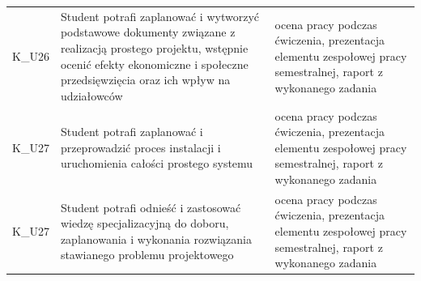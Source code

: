 \documentclass[12pt, a4paper]{article}
\begin{document}
{\begin{longtable}{m{1.6cm}m{9.0cm}m{4.2cm}}
  \rowcolor{tableRowLight} K\_U26 & Student potrafi zaplanować i wytworzyć podstawowe dokumenty związane z realizacją prostego projektu, wstępnie ocenić efekty ekonomiczne i społeczne przedsięwzięcia oraz ich wpływ na udziałowców & ocena pracy podczas ćwiczenia, prezentacja elementu zespołowej pracy semestralnej, raport z wykonanego zadania \\
  \rowcolor{tableRowAlt} K\_U27 & Student potrafi zaplanować i przeprowadzić proces instalacji i uruchomienia całości prostego systemu & ocena pracy podczas ćwiczenia, prezentacja elementu zespołowej pracy semestralnej, raport z wykonanego zadania \\
  \rowcolor{tableRowLight} K\_U27 & Student potrafi odnieść i zastosować wiedzę specjalizacyjną do doboru, zaplanowania i wykonania rozwiązania stawianego problemu projektowego & ocena pracy podczas ćwiczenia, prezentacja elementu zespołowej pracy semestralnej, raport z wykonanego zadania \\
\bottomrule
\end{longtable}}
\end{document}
